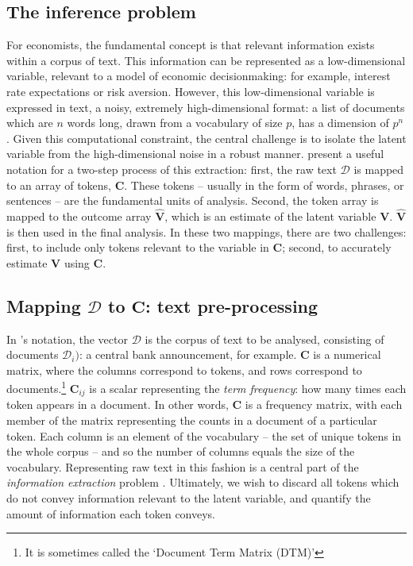 \documentclass[12pt,a4]{article}
\begin{document}
\subsection{The inference problem}
For economists, the fundamental concept is that relevant information exists within a corpus of text. This information can be represented as a low-dimensional variable, relevant to a model of economic decisionmaking: for example, interest rate expectations or risk aversion. However, this low-dimensional variable is expressed in text, a noisy, extremely high-dimensional format: a list of documents which are \(n\) words long, drawn from a vocabulary of size \(p\), has a dimension of \(p^n\). Given this computational constraint, the central challenge is to isolate the latent variable from the high-dimensional noise in a robust manner.  \textcite{gentzkowTextData2019} present a useful notation for a two-step process of this extraction: first, the raw text \(\mathcal{D}\) is mapped to an array of tokens, \(\mathbf{C}\). These tokens -- usually in the form of words, phrases, or sentences -- are the fundamental units of analysis. Second, the token array is mapped to the outcome array \(\hat{\mathbf{V}}\), which is an estimate of the latent variable \(\mathbf{V}\). \(\hat{\mathbf{V}} \) is then used in the final analysis. In these two mappings, there are two challenges: first, to include only tokens relevant to the variable in \(\mathbf{C}\); second, to accurately estimate  \(\mathbf{V} \) using \(\mathbf{C}\). 

\subsection{Mapping \(\mathcal{D}\) to \(\mathbf{C}\): text pre-processing}\label{preprocess}
In \textcite{gentzkowTextData2019}'s notation, the vector \(\mathcal{D}\) is the corpus of text to be analysed, consisting of documents \(\mathcal{D}_i)\): a central bank announcement, for example. \(\mathbf{C}\) is a numerical matrix, where the columns correspond to tokens, and rows correspond to documents.\footnote{It is sometimes called the `Document Term Matrix (DTM)'} \(\mathbf{C}_{ij}\) is a scalar representing the \textit{term frequency}: how many times each token appears in a document. In other words, \(\mathbf{C}\) is a frequency matrix, with each member of the matrix representing the counts in a document of a particular token. Each column is an element of the vocabulary -- the set of unique tokens in the whole corpus -- and so the number of columns equals the size of the vocabulary. Representing raw text in this fashion is a central part of the \textit{information extraction} problem \parencite[529]{manningFoundationsStatisticalNatural1999}. Ultimately, we wish to discard all tokens which do not convey information relevant to the latent variable, and quantify the amount of information each token conveys.
\end{document}
